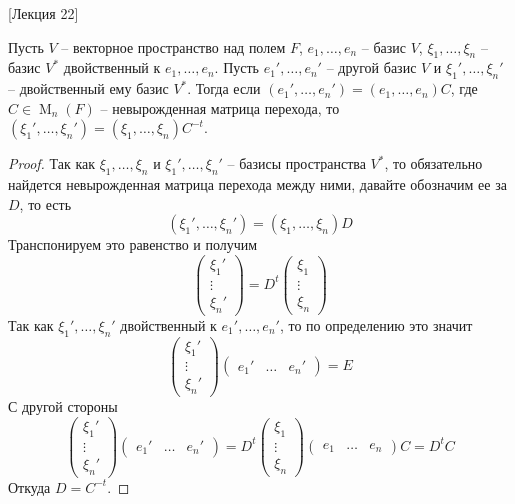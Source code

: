 [Лекция 22]


\begin{claim}
\label{claim::DualBasisChange}
Пусть $V$ -- векторное пространство над полем $F$, $e_1,\ldots,e_n$ -- базис $V$, $\xi_1,\ldots,\xi_n$ -- базис $V^*$ двойственный к $e_1,\ldots,e_n$.
Пусть $e_1',\ldots,e_n'$ -- другой базис $V$ и $\xi_1',\ldots,\xi_n'$ -- двойственный ему базис $V^*$.
Тогда если $(e_1',\ldots,e_n') = (e_1,\ldots,e_n)C$, где $C\in \operatorname{M}_n(F)$ -- невырожденная матрица перехода, то $(\xi_1',\ldots,\xi_n') = (\xi_1,\ldots,\xi_n)C^{-t}$.
\end{claim}
\begin{proof}
Так как $\xi_1,\ldots,\xi_n$ и $\xi_1',\ldots,\xi_n'$ -- базисы пространства $V^*$, то обязательно найдется невырожденная матрица перехода между ними, давайте обозначим ее за $D$, то есть
\[
(\xi_1',\ldots,\xi_n') = (\xi_1,\ldots,\xi_n)D
\]
Транспонируем это равенство и получим
\[
\begin{pmatrix}
{\xi_1'}\\{\vdots}\\{\xi_n'}
\end{pmatrix}
=
D^t
\begin{pmatrix}
{\xi_1}\\{\vdots}\\{\xi_n}
\end{pmatrix}
\]
Так как $\xi_1',\ldots,\xi_n'$ двойственный к $e_1',\ldots,e_n'$, то по определению это значит
\[
\begin{pmatrix}
{\xi_1'}\\{\vdots}\\{\xi_n'}
\end{pmatrix}
\begin{pmatrix}
{e_1'}&{\ldots}&{e_n'}
\end{pmatrix}
=
E
\]
С другой стороны
\[
\begin{pmatrix}
{\xi_1'}\\{\vdots}\\{\xi_n'}
\end{pmatrix}
\begin{pmatrix}
{e_1'}&{\ldots}&{e_n'}
\end{pmatrix}
=
D^t
\begin{pmatrix}
{\xi_1}\\{\vdots}\\{\xi_n}
\end{pmatrix}
\begin{pmatrix}
{e_1}&{\ldots}&{e_n}
\end{pmatrix}
C
=
D^t C
\]
Откуда $D = C^{-t}$.
\end{proof}



